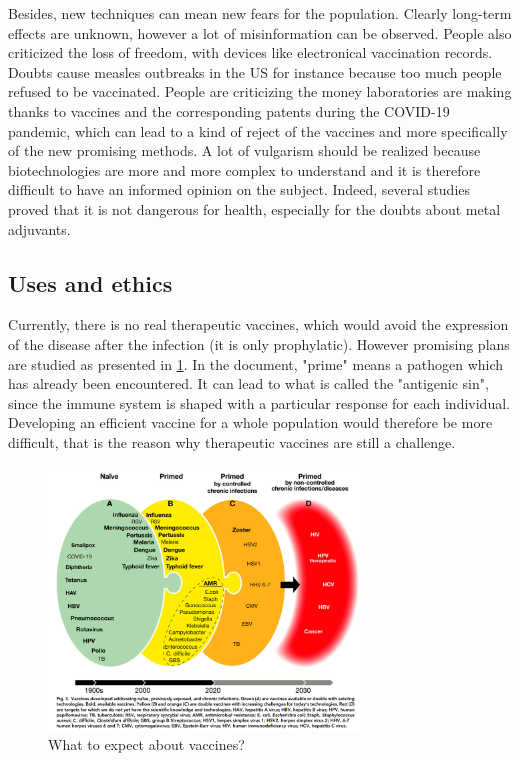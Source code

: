 \documentclass{article}
\begin{document}
            Besides, new techniques can mean new fears for the population.
            Clearly long-term effects are unknown, however a lot of misinformation can be observed.
            People also criticized the loss of freedom, with devices like electronical vaccination records.
            Doubts cause measles outbreaks in the US for instance because too much people refused to be vaccinated.
            People are criticizing the money laboratories are making thanks to vaccines and the corresponding patents during the COVID-19 pandemic, 
                which can lead to a kind of reject of the vaccines and more specifically of the new promising methods.
            A lot of vulgarism should be realized because biotechnologies are more and more complex to understand
                and it is therefore difficult to have an informed opinion on the subject. 
            Indeed, several studies proved that it is not dangerous for health, especially for the doubts about metal adjuvants.

    \subsection{Uses and ethics}
        
        Currently, there is no real therapeutic vaccines, which would avoid the expression of the disease after the infection (it is only prophylatic).
            However promising plans are studied as presented in \ref{fig:vaccEvolution}.
            In the document, "prime" means a pathogen which has already been encountered. It can lead to what is called the "antigenic sin", 
            since the immune system is shaped with a particular response for each individual. Developing an efficient vaccine for a whole population would therefore be more difficult,
            that is the reason why therapeutic vaccines are still a challenge.

        \begin{figure}
            \centering
            \includegraphics[width=0.75\textwidth]{imgs/vaccineEvolution.PNG}
            \caption{What to expect about vaccines? \autocite{rappuoliVaccinologyPostCOVID192021}}
            \label{fig:vaccEvolution}
        \end{figure}
\end{document}
